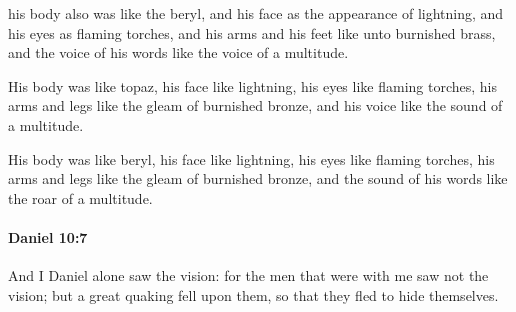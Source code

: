 			\begin{versebox}
					\item[BHS] 
					\item[LXX] 
					\item[ASV] his body also was like the beryl, and his face as the appearance of lightning, and his eyes as flaming torches, and his arms and his feet like unto burnished brass, and the voice of his words like the voice of a multitude.
					\item[NIV] His body was like topaz, his face like lightning, his eyes like flaming torches, his arms and legs like the gleam of burnished bronze, and his voice like the sound of a multitude.
					\item[NRSV] His body was like beryl, his face like lightning, his eyes like flaming torches, his arms and legs like the gleam of burnished bronze, and the sound of his words like the roar of a multitude.
			\end{versebox}

		\paragraph{Daniel 10:7} %
			\label{DANIEL-10-7}

			And I Daniel alone saw the vision: for the men that were with me saw not the vision; but a great quaking fell upon them, so that they fled to hide themselves.

